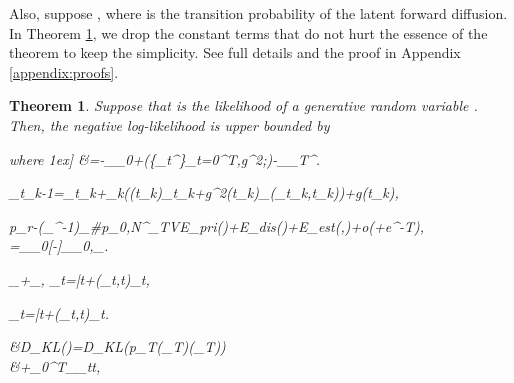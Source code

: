 \documentclass{article}
\newtheorem{theorem}{Theorem}\newtheorem{proposition}{Proposition}
\theoremstyle{definition}
\theoremstyle{remark}
\newcommand*\diff{\mathop{}\!\mathrm{d}}
\begin{document}
	Also, suppose , where  is the transition probability of the latent forward diffusion. In Theorem \ref{thm:1}, we drop the constant terms that do not hurt the essence of the theorem to keep the simplicity. See full details and the proof in Appendix \ref{appendix:proofs}.
	\reqnomode
	\begin{theorem}\label{thm:1}
		Suppose that  is the likelihood of a generative random variable . Then, the negative log-likelihood is upper bounded by
		
		where
		1ex]
		&=-_{_{0}}+\big(\{_{t}^{\bm{\phi}}\}_{t=0}^{T},g^{2};\bm{\theta}\big)-_{_{T}^{\bm{\phi}}}.\label{main_eq:training_loss}
		
	_{t_{k-1}}=_{t_{k}}+\gamma_{k}\bigg(\beta(t_{k})_{t_{k}}+g^{2}(t_{k})_{\bm{\theta}}(_{t_{k}},t_{k})\bigg)+g(t_{k})\bm{\epsilon},
	
		\Vert p_{r}-(_{\bm{\phi}}^{-1})_{\#}\circ p_{0,N}^{\bm{\theta}}\Vert_{TV}\le E_{pri}(\bm{\phi})+E_{dis}(\bm{\phi})+E_{est}(\bm{\phi},\bm{\theta})+o(\sqrt{\delta}+e^{-T}),
		\label{eq:nll_computation}
	=_{_{0}}[-]\le{}_{_{0},_{\epsilon}}.
	
	_{}+_{},
	\label{eq:general_reverse}
	\diff{}_{t}=\diff \bar{t}+(_{t},t)\diff{}_{t},
	
	\diff{}_{t}=\diff \bar{t}+(_{t},t)\diff{}_{t}.\label{eq:general_generative}
	
	\begin{split}\label{eq:generalized_diffusion_loss}
	&D_{KL}(\bm{\mu}\Vert\bm{\nu})=D_{KL}(p_{T}(_{T})\Vert \pi(_{T}))\\
	&\quad+\int_{0}^{T}_{_{t}}\diff t,
	\end{split}
	

\end{theorem}
\end{document}
